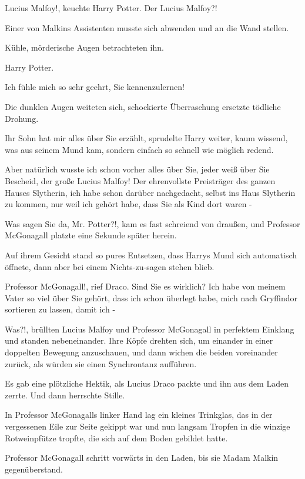 \glqq{}Lucius Malfoy!\grqq{}, keuchte Harry Potter. \glqq{}Der Lucius
Malfoy?!\grqq{}

Einer von Malkins Assistenten musste sich abwenden und an die Wand stellen.

Kühle, mörderische Augen betrachteten ihn.

\glqq{}Harry Potter.\grqq{}

\glqq{}Ich fühle mich so sehr geehrt, Sie kennenzulernen!\grqq{}

Die dunklen Augen weiteten sich, schockierte Überraschung ersetzte tödliche
Drohung.

\glqq{}Ihr Sohn hat mir alles über Sie erzählt\grqq{}, sprudelte Harry weiter,
kaum wissend, was aus seinem Mund kam, sondern einfach so schnell wie möglich
redend.

\glqq{}Aber natürlich wusste ich schon vorher alles über Sie, jeder weiß über Sie
Bescheid, der große Lucius Malfoy! Der ehrenvollste Preisträger des ganzen
Hauses Slytherin, ich habe schon darüber nachgedacht, selbst ins Haus Slytherin
zu kommen, nur weil ich gehört habe, dass Sie als Kind dort waren -\grqq{}

\glqq{}Was sagen Sie da, Mr. Potter?!\grqq{}, kam es fast schreiend von draußen,
und Professor McGonagall platzte eine Sekunde später herein.

Auf ihrem Gesicht stand so pures Entsetzen, dass Harrys Mund sich automatisch
öffnete, dann aber bei einem Nichts-zu-sagen stehen blieb.

\glqq{}Professor McGonagall!\grqq{}, rief Draco. \glqq{}Sind Sie es wirklich? Ich
habe von meinem Vater so viel über Sie gehört, dass ich schon überlegt habe,
mich nach Gryffindor sortieren zu lassen, damit ich -\grqq{}

\glqq{}Was?!,\grqq{} brüllten Lucius Malfoy und Professor McGonagall in perfektem
Einklang und standen nebeneinander. Ihre Köpfe drehten sich, um einander in
einer doppelten Bewegung anzuschauen, und dann wichen die beiden voreinander
zurück, als würden sie einen Synchrontanz aufführen.

Es gab eine plötzliche Hektik, als Lucius Draco packte und ihn aus dem Laden
zerrte. Und dann herrschte Stille.

In Professor McGonagalls linker Hand lag ein kleines Trinkglas, das in der
vergessenen Eile zur Seite gekippt war und nun langsam Tropfen in die winzige
Rotweinpfütze tropfte, die sich auf dem Boden gebildet hatte.

Professor McGonagall schritt vorwärts in den Laden, bis sie Madam Malkin
gegenüberstand.

